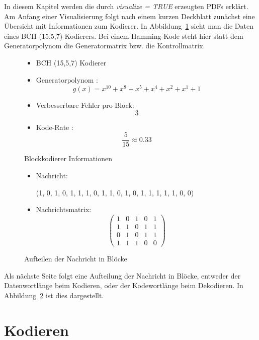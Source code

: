 \setcounter{MaxMatrixCols}{20}

In diesem Kapitel werden die durch \emph{visualize = TRUE} erzeugten PDFs erklärt. Am Anfang einer Visualisierung folgt nach einem kurzen Deckblatt zunächst eine Übersicht mit Informationen zum Kodierer. In Abbildung~\ref{fig:blockinfo} sieht man die Daten eines BCH-(15,5,7)-Kodierers. Bei einem Hamming-Kode steht hier statt dem Generatorpolynom die Generatormatrix bzw. die Kontrollmatrix. 

\begin{figure}[!h]
\begin{itemize}
\itemsep1pt\parskip0pt
\item
  BCH (15,5,7) Kodierer
\item
  Generatorpolynom :
  \[g(x) =  x^{10} + x^{8} + x^{5} + x^{4} + x^{2} + x^{1} + 1\]
\item
  Verbesserbare Fehler pro Block: \[3\]
\item
  Kode-Rate : \[\frac{5}{15} \approx 0.33\]
\end{itemize}
\caption{Blockkodierer Informationen}
\label{fig:blockinfo}
\end{figure}

\begin{figure}[!h]
\begin{itemize}
\itemsep1pt\parskip0pt
\item
  Nachricht:

  \begin{center}(1, 0, 1, 0, 1, 1, 1, 0, 1, 1, 0, 1, 0, 1, 1, 1, 1, 1, 0, 0)\end{center}
\item
  Nachrichtsmatrix:
  \[\begin{pmatrix}1&0&1&0&1\\1&1&0&1&1\\0&1&0&1&1\\1&1&1&0&0\end{pmatrix}\]
\end{itemize}
\caption{Aufteilen der Nachricht in Blöcke}
\label{fig:slice}
\end{figure}

Als nächste Seite folgt eine Aufteilung der Nachricht in Blöcke, entweder der Datenwortlänge beim Kodieren, oder der Kodewortlänge beim Dekodieren. In Abbildung~\ref{fig:slice} ist dies dargestellt.

\vspace{2cm}

\section{Kodieren}


